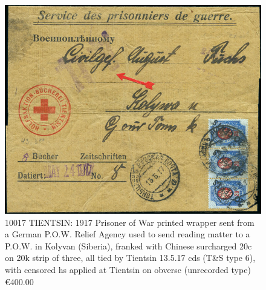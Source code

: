 \begin{figure}[htbp]
\centering
\includegraphics[width=.95\textwidth]{../russian-post-offices-in-china/10017.jpg}
\caption{
10017	TIENTSIN: 1917 Prisoner of War printed wrapper sent from a German P.O.W. 
Relief Agency used to send reading matter to a P.O.W. in Kolyvan (Siberia), 
franked with Chinese surcharged 20c on 20k strip of three, all tied by 
Tientsin 13.5.17 cds (T\&S type 6), with censored hs applied at Tientsin on 
obverse (unrecorded type)
\euro 400.00
}  
\end{figure}

